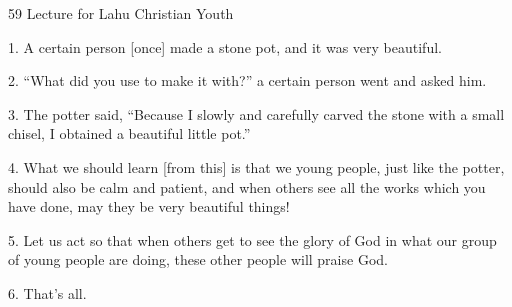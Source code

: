 
59 Lecture for Lahu Christian Youth

1. A certain person [once] made a stone pot, and it was very beautiful.

2. ``What did you use to make it with?'' a certain person went and asked him.

3. The potter said, ``Because I slowly and carefully carved the stone with a small
chisel, I obtained a beautiful little pot.''

4. What we should learn [from this] is that we young people, just like the potter,
should also be calm and patient, and when others see all the works which you have
done, may they be very beautiful things!

5. Let us act so that when others get to see the glory of God in what our group
of young people are doing, these other people will praise God.

6. That's all.


